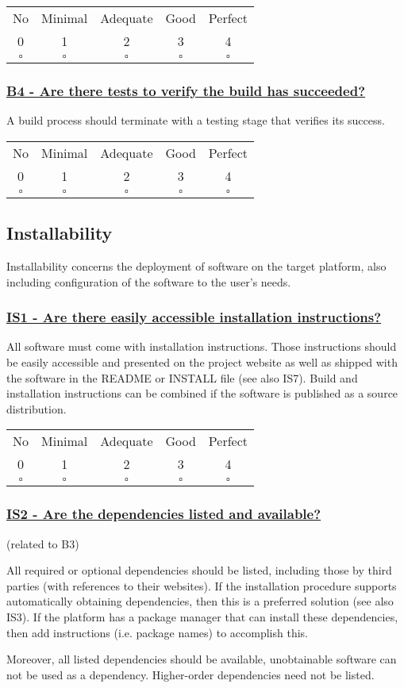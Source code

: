\documentclass[a4paper,11pt]{article}
\newcommand{\criterion}[2]{\subsubsection*{\underline{#1 - #2}}\label{id:#1}}
\newcommand\CheckTable{%
  \begin{tabular}{ccccc}
    No & Minimal & Adequate & Good & Perfect \\
    0 & 1 & 2 & 3 & 4 \\
    \hline
    $\square$ & $\square$ & $\square$ & $\square$ & $\square$ \\
  \end{tabular}%
}
\begin{document}
\CheckTable

\newcommand{\bFourID}{B4}
\newcommand{\bFourText}{Are there tests to verify the build has succeeded?}
\criterion{\bFourID}{\bFourText}

A build process should terminate with a testing stage that verifies its success.

\CheckTable

\subsection{Installability}\label{sec:ins}

Installability concerns the deployment of software on the target platform, also
including configuration of the software to the user's needs.

\newcommand{\isOneID}{IS1}
\newcommand{\isOneText}{Are there easily accessible installation instructions?}
\criterion{\isOneID}{\isOneText}

All software must come with installation instructions. Those instructions should
be easily accessible and presented on the project website as well as shipped
with the software in the README or INSTALL file (see also IS7). Build and installation
instructions can be combined if the software is published as a source
distribution.

\CheckTable

\newcommand{\isTwoID}{IS2}
\newcommand{\isTwoText}{Are the dependencies listed and available?}
\criterion{\isTwoID}{\isTwoText}
(related to B3)

All required or optional dependencies should be listed, including those by
third parties (with references to their websites). If the installation
procedure supports automatically obtaining dependencies, then this is a
preferred solution (see also IS3). If the platform has a package manager that
can install these dependencies, then add instructions (i.e. package names) to
accomplish this.

Moreover, all listed dependencies should be available, unobtainable software
can not be used as a dependency. Higher-order dependencies need not be listed.
%
%
\end{document}
